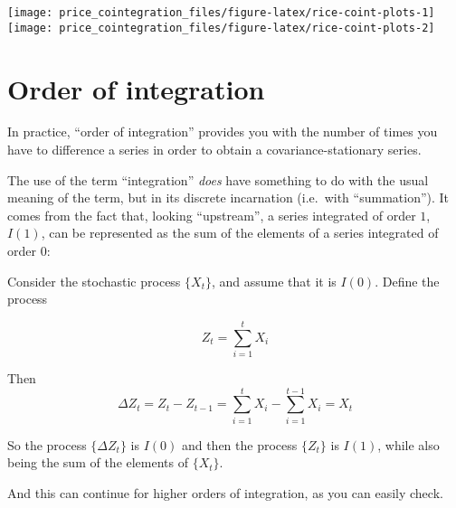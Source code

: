 \documentclass[12pt,]{article}
\begin{document}
\begin{center}\texttt{[image: price\_cointegration\_files/figure-latex/rice-coint-plots-1]} \texttt{[image: price\_cointegration\_files/figure-latex/rice-coint-plots-2]} \end{center}

\hypertarget{order-of-integration}{%
\section{Order of integration}\label{order-of-integration}}

In practice, ``order of integration'' provides you with the number of times you have to difference a series in order to obtain a covariance-stationary series.

The use of the term ``integration'' \emph{does} have something to do with the usual meaning of the term, but in its discrete incarnation (i.e.~with ``summation''). It comes from the fact that, looking ``upstream'', a series integrated of order \(1\), \(I(1)\), can be represented as the sum of the elements of a series integrated of order \(0\):

Consider the stochastic process \(\{X_t\}\), and assume that it is \(I(0)\). Define the process

\[Z_t = \sum_{i=1}^tX_i\]

Then
\[\Delta Z_t = Z_t - Z_{t-1} = \sum_{i=1}^tX_i - \sum_{i=1}^{t-1}X_i = X_t\]

So the process \(\{\Delta Z_t\}\) is \(I(0)\) and then the process \(\{Z_t\}\) is \(I(1)\), while also being the sum of the elements of \(\{X_t\}\).

And this can continue for higher orders of integration, as you can easily check.
\end{document}
